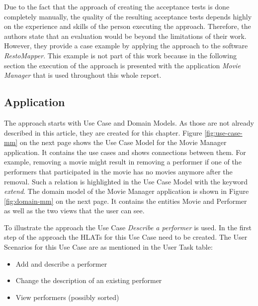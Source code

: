 Due to the fact that the approach of creating the acceptance tests is done completely manually, the quality of the resulting acceptance tests depends highly on the experience and skills of the person executing the approach.
Therefore, the authors state that an evaluation would be beyond the limitations of their work.
However, they provide a case example by applying the approach to the software \textit{RestoMapper}.
This example is not part of this work because in the following section the execution of the approach is presented with the application \textit{Movie Manager} that is used throughout this whole report.

\subsection{Application}

The approach starts with Use Case and Domain Models.
As those are not already described in this article, they are created for this chapter.
Figure \ref{fig:use-case-mm} on the next page shows the Use Case Model for the Movie Manager application.
It contains the use cases and shows connections between them.
For example, removing a movie might result in removing a performer if one of the performers that participated in the movie has no movies anymore after the removal.
Such a relation is highlighted in the Use Case Model with the keyword \textit{extend}.
The domain model of the Movie Manager application is shown in Figure \ref{fig:domain-mm} on the next page.
It contains the entities Movie and Performer as well as the two views that the user can see.

To illustrate the approach the Use Case \textit{Describe a performer} is used.
In the first step of the approach the HLATs for this Use Case need to be created.
The User Scenarios for this Use Case are as mentioned in the User Task table:
\begin{itemize}
	\item Add and describe a performer
	\item Change the description of an existing performer
	\item View performers (possibly sorted)
\end{itemize}

